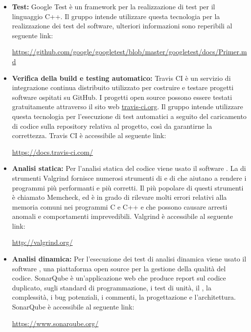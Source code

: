 \documentclass[../NormediProgetto.tex]{subfiles}
\begin{document}
	\begin{itemize}
		\item \textbf{Test:} Google Test è un framework per la realizzazione di test per il linguaggio C++. Il gruppo intende utilizzare questa tecnologia per la realizzazione dei test del software, ulteriori informazioni sono reperibili al seguente link:
		\begin{center}
			\url{https://github.com/google/googletest/blob/master/googletest/docs/Primer.md}
		\end{center}
		\item \textbf{Verifica della build e testing automatico:} Travis CI è un servizio di integrazione continua distribuito utilizzato per costruire e testare progetti software ospitati su GitHub. I progetti open source possono essere testati gratuitamente attraverso il sito web \url{travis-ci.org}. Il gruppo intende utilizzare questa tecnologia per l'esecuzione di test automatici a seguito del caricamento di codice sulla repository relativa al progetto, così da garantirne la correttezza. Travis CI è accessibile al seguente link:
		\begin{center}
			\url{https://docs.travis-ci.com/}
		\end{center}
		
		\item \textbf{Analisi statica:} Per l’analisi statica del codice viene usato il software . La  di strumenti Valgrind fornisce numerosi strumenti di  e di  che aiutano a rendere i programmi più performanti e più corretti. Il più popolare di questi strumenti è chiamato Memcheck, ed è in grado di rilevare molti errori relativi alla memoria comuni nei programmi C e C++ e che possono causare arresti anomali e comportamenti imprevedibili. Valgrind è accessibile al seguente link: 
		\begin{center}
			\url{http://valgrind.org/}
		\end{center}
		
		\item \textbf{Analisi dinamica:} Per l’esecuzione dei test di analisi dinamica viene usato il software , una piattaforma open source per la gestione della qualità del codice. SonarQube è un’applicazione web che produce report sul codice duplicato, sugli standard di programmazione, i test di unità, il , la complessità, i bug potenziali, i commenti, la progettazione e l’architettura. SonarQube è accessibile al seguente link:
		\begin{center}
			\url{https://www.sonarqube.org/}
		\end{center}
		

\end{itemize}
\end{document}
